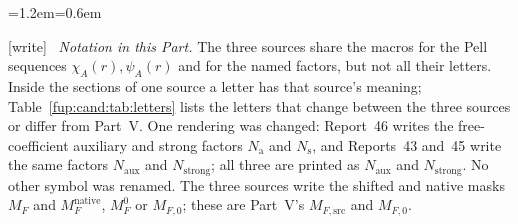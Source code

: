 \documentclass[11pt,letterpaper]{article}
\theoremstyle{definition}\newtheorem{definition}[theorem]{Definition}
\theoremstyle{remark}\newtheorem{remark}[theorem]{Remark}
\newcommand{\MFsrcV}{M_{F,\mathrm{src}}}
\newcommand{\MFnatV}{M_{F,0}}
\newcommand{\Na}{N_{\mathrm{aux}}}\newcommand{\Nk}{N_{\mathrm{index}}}\newcommand{\Nt}{N_{\mathrm{transport}}}
\newcommand{\Ns}{N_{\mathrm{strong}}}
\newcommand{\wtag}{\textup{[write]}}
\newenvironment{writenote}{\par\smallskip\begin{list}{}{\leftmargin=1.2em\rightmargin=0.6em}\item[]\small\wtag\ }{\end{list}\smallskip}
\begin{document}
\begin{writenote}
\emph{Notation in this Part.} The three sources share the macros for the Pell sequences $\chi_A(r),\psi_A(r)$ and for the named factors, but not all their letters. Inside the sections of one source a letter has that source's meaning; Table~\ref{fup:cand:tab:letters} lists the letters that change between the three sources or differ from Part~V. One rendering was changed: Report~46 writes the free-coefficient auxiliary and strong factors $N_{\mathrm a}$ and $N_{\mathrm s}$, and Reports~43 and~45 write the same factors $N_{\mathrm{aux}}$ and $N_{\mathrm{strong}}$; all three are printed as $\Na$ and $\Ns$. No other symbol was renamed. The three sources write the shifted and native masks $M_F$ and $M_F^{\mathrm{native}}$, $M_F^0$ or $M_{F,0}$; these are Part~V's $\MFsrcV$ and $\MFnatV$.
\end{writenote}
\end{document}
